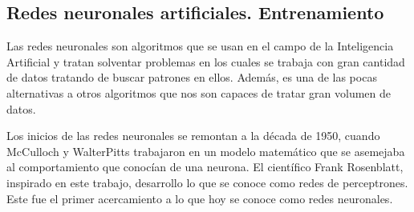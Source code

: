 \subsection{Redes neuronales artificiales. Entrenamiento}

Las redes neuronales son algoritmos que se usan en el campo de la Inteligencia Artificial y tratan solventar problemas en los cuales se trabaja con gran cantidad de datos tratando de buscar patrones en ellos. Además, es una de las pocas alternativas a otros algoritmos que nos son capaces de tratar gran volumen de datos. 
\newline

Los inicios de las redes neuronales se remontan a la década de 1950, cuando McCulloch y WalterPitts\cite{kleene} trabajaron en un modelo matemático que se asemejaba al comportamiento que conocían de una neurona. El científico Frank Rosenblatt, inspirado en este trabajo, desarrollo lo que se conoce como redes de perceptrones. Este fue el primer acercamiento a lo que hoy se conoce como redes neuronales\cite{nielsen}. 








